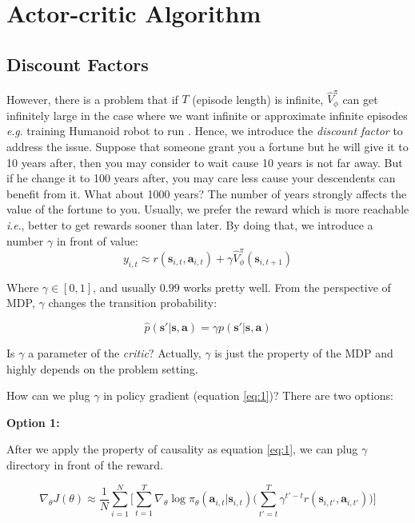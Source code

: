 \documentclass{tufte-handout}
\newcommand{\ie}{\textit{i}.\textit{e}., }
\newcommand{\eg}{\textit{e}.\textit{g}. }
\newcommand{\s}{\mathbf{s}}
\newcommand{\act}{\mathbf{a}}
\begin{document}
\section{Actor-critic Algorithm}


\subsection{Discount Factors}
However, there is a problem that if $T$ (episode length) is infinite, $\hat{V}_\phi ^ \pi$ can get infinitely large in the case where we want infinite or
approximate infinite episodes \eg training Humanoid robot to run . Hence, we introduce the \emph{discount factor} to address the issue. Suppose that someone grant you a fortune but he will give it to 10 years after, then you may consider to wait cause 10 years is not far away. But if he change it to 100 years after, you may care less cause your descendents can benefit from it. What about 1000 years? The number of years strongly affects the value of the fortune to you. Usually, we prefer the reward which is more reachable \ie better to get rewards sooner than later.
By doing that, we introduce a number $\gamma$ in front of value:
\begin{equation}
\label{eq:18}
y_{i,t} \approx
r(\s_{i,t}, \act_{i,t}) + \gamma \hat{V}^\pi _ \phi (\s_{i, t+1})
\end{equation}

Where $\gamma \in [0, 1]$, and usually $0.99$ works pretty well. From the perspective of MDP, $\gamma$ changes the transition probability:

\begin{equation}
\label{eq:19}
\hat{p}(\s' | \s, \act) = \gamma p(\s' | \s, \act)
\end{equation}

Is $\gamma$ a parameter of the \emph{critic}? Actually, $\gamma$ is just the property of the MDP and highly depends on the problem setting.

How can we plug $\gamma$ in policy gradient (equation \ref{eq:1})? There are two options:

\textbf{Option 1:}

After we apply the property of causality as equation \ref{eq:1}, we can plug $\gamma$ directory in front of the reward.

\begin{equation}
\label{eq:20}
\nabla _\theta J(\theta) \approx \frac{1}{N} \sum_{i=1} ^ {N} \bigg[\sum_{t=1}^T \nabla_\theta \log \pi_\theta(\act_{i,t}| \s_{i,t})
\Big( \sum_{t'=t}^T \gamma ^ {t' - t} r(\s_{i, t'}, \act_{i, t'}) \Big) \bigg]
\end{equation}
\end{document}
